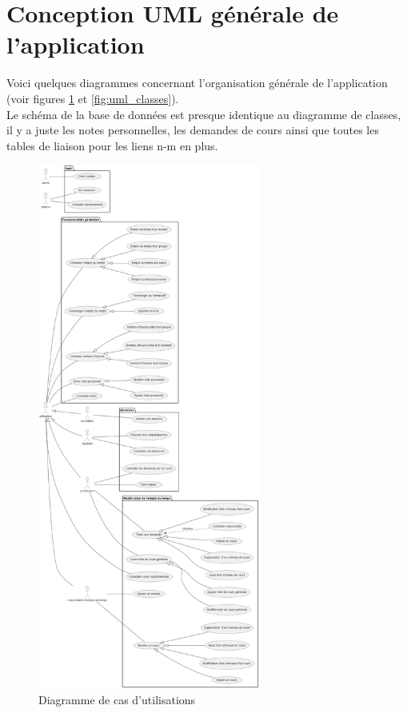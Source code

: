 \documentclass[a4paper,12pt]{article}
\begin{document}
\section{Conception UML générale de l’application}
Voici quelques diagrammes concernant l'organisation générale de l'application (voir figures \ref{fig:uml_uc} et \ref{fig:uml_classes}).\\
Le schéma de la base de données est presque identique au diagramme de classes, il y a juste les notes personnelles, les demandes de cours ainsi que toutes les tables de liaison 
pour les liens n-m en plus.\\
\begin{figure}[h]
    \centering
    \includegraphics[width=0.65\textwidth]{UC.png}
    \caption{Diagramme de cas d'utilisations}
    \label{fig:uml_uc}
\end{figure}
\end{document}
